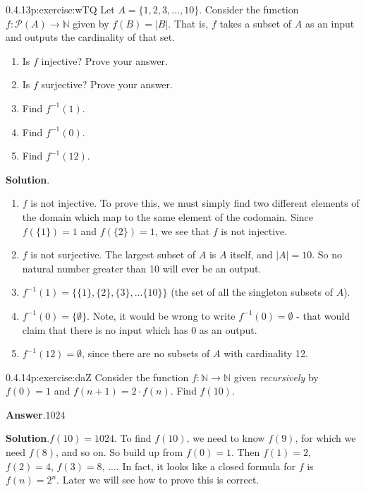 \documentclass[twoside,11pt,]{book}
\newcommand{\blocktitlefont}{\relax}
\numberwithin{equation}{chapter}
\newcommand{\N}{\mathbb N}
\newcommand{\pow}{\mathcal P}
\newcommand{\inv}{^{-1}}
\begin{document}
\begin{divisionsolution}{0.4.13}{}{p:exercise:wTQ}%
Let \(A = \{1,2,3,\ldots,10\}\). Consider the function \(f:\pow(A) \to \N\) given by \(f(B) = |B|\). That is, \(f\) takes a subset of \(A\) as an input and outputs the cardinality of that set.%
\begin{enumerate}[label=(\alph*)]
\item{}Is \(f\) injective? Prove your answer.%
\item{}Is \(f\) surjective? Prove your answer.%
\item{}Find \(f\inv(1)\).%
\item{}Find \(f\inv(0)\).%
\item{}Find \(f\inv(12)\).%
\end{enumerate}
%
\par\smallskip%
\noindent\textbf{\blocktitlefont Solution}.\quad{}%
\begin{enumerate}[label=(\alph*)]
\item{}\(f\) is not injective. To prove this, we must simply find two different elements of the domain which map to the same element of the codomain. Since \(f(\{1\}) = 1\) and \(f(\{2\}) = 1\), we see that \(f\) is not injective.%
\item{}\(f\) is not surjective. The largest subset of \(A\) is \(A\) itself, and \(|A| = 10\). So no natural number greater than 10 will ever be an output.%
\item{}\(f\inv(1) = \{\{1\}, \{2\}, \{3\}, \ldots \{10\}\}\) (the set of all the singleton subsets of \(A\)).%
\item{}\(f\inv(0) = \{\emptyset\}\). Note, it would be wrong to write \(f\inv(0) = \emptyset\) - that would claim that there is no input which has 0 as an output.%
\item{}\(f\inv(12) = \emptyset\), since there are no subsets of \(A\) with cardinality 12.%
\end{enumerate}
%
\end{divisionsolution}%
\begin{divisionsolution}{0.4.14}{}{p:exercise:daZ}%
Consider the function \(f:\N \to \N\) given \emph{recursively} by \(f(0) = 1\) and \(f(n+1) = 2\cdot f(n)\text{.}\) Find \(f(10)\text{.}\)%
\par\smallskip%
\noindent\textbf{\blocktitlefont Answer}.\quad{}\(1024\)%
\par\smallskip%
\noindent\textbf{\blocktitlefont Solution}.\quad{}\(f(10) = 1024\text{.}\) To find \(f(10)\text{,}\) we need to know \(f(9)\text{,}\) for which we need \(f(8)\text{,}\) and so on. So build up from \(f(0) = 1\text{.}\) Then \(f(1) = 2\text{,}\) \(f(2) = 4\text{,}\) \(f(3) = 8\text{,}\) .... In fact, it looks like a closed formula for \(f\) is \(f(n) = 2^n\text{.}\) Later we will see how to prove this is correct.%
\end{divisionsolution}%
\end{document}

